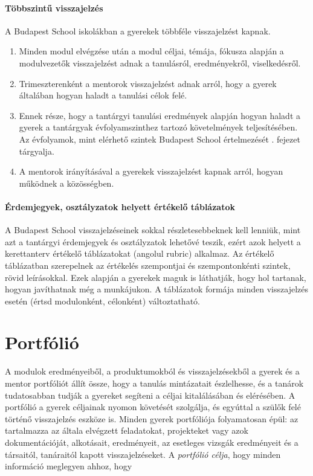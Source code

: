 \paragraph{Többszintű visszajelzés} A Budapest School iskolákban a gyerekek
többféle visszajelzést kapnak. \begin{enumerate}
      \item Minden modul elvégzése után a modul céljai, témája, fókusza alapján
            a
            modulvezetők visszajelzést adnak a tanulásról, eredményekről,
            viselkedésről.
      \item Trimeszterenként a mentorok visszajelzést adnak arról, hogy a
            gyerek
            általában hogyan haladt a tanulási célok felé.
      \item Ennek része, hogy a tantárgyi tanulási eredmények alapján hogyan
            haladt a
            gyerek a tantárgyak évfolyamszinthez tartozó követelmények
            teljesítésében. Az
            évfolyamok, mint elérhető szintek Budapest School értelmezését
            . fejezet tárgyalja.
      \item A mentorok irányításával a gyerekek visszajelzést kapnak arról,
            hogyan
            működnek a közösségben.
\end{enumerate}

\paragraph{Érdemjegyek, osztályzatok helyett értékelő táblázatok} A Budapest
School visszajelzéseinek sokkal részletesebbeknek kell lenniük, mint azt a
tantárgyi érdemjegyek és osztályzatok lehetővé teszik, ezért azok helyett a
kerettanterv
értékelő táblázatokat (angolul rubric) alkalmaz. Az értékelő táblázatban
szerepelnek az értékelés szempontjai és szempontonkénti szintek, rövid
leírásokkal.
Ezek alapján a gyerekek maguk is láthatják, hogy hol tartanak, hogyan
javíthatnak még a munkájukon. A táblázatok formája minden visszajelzés esetén
(értsd modulonként, célonként)
változtatható.

\section{Portfólió}
\label{sec:portfolio}
A modulok eredményeiből, a produktumokból és visszajelzésekből a gyerek és a
mentor portfóliót
állít össze, hogy a tanulás mintázatait észlelhesse, és a
tanárok tudatosabban tudják
a gyereket segíteni a céljai kitalálásában és elérésében. A portfólió a gyerek
céljainak nyomon követését szolgálja, és egyúttal a szülők felé történő
visszajelzés eszköze
is. Minden gyerek portfóliója folyamatosan épül: az tartalmazza az általa
elvégzett feladatokat, projekteket vagy azok dokumentációját, alkotásait,
eredményeit, az esetleges vizsgák eredményeit és a társaitól, tanáraitól kapott
visszajelzéseket. A \emph{portfólió célja}, hogy minden információ meglegyen
ahhoz,
hogy

